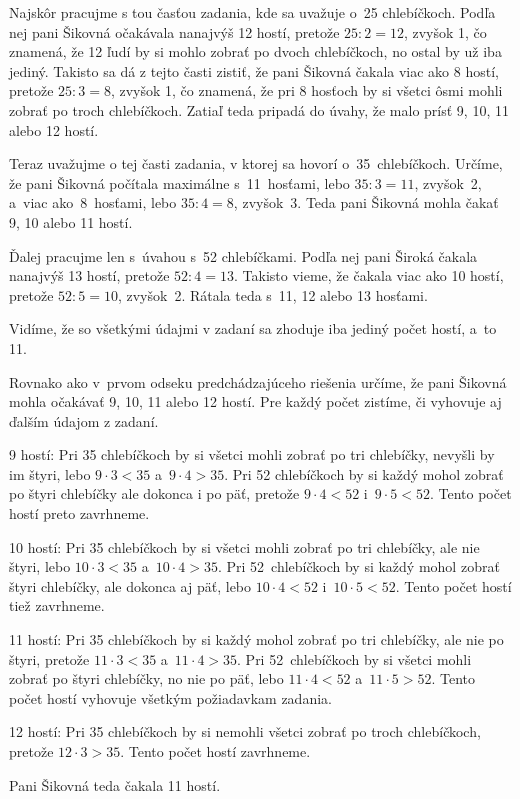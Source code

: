 {%
Najskôr pracujme s tou časťou zadania, kde sa uvažuje o~25 chlebíčkoch. Podľa nej
pani Šikovná očakávala nanajvýš 12 hostí, pretože $25 : 2 = 12$, zvyšok 1, čo
znamená, že 12 ľudí by si mohlo zobrať po dvoch chlebíčkoch, no ostal by už iba jediný.
Takisto sa dá z tejto časti zistiť, že pani Šikovná čakala viac ako 8 hostí, pretože
$25 : 3 = 8$, zvyšok 1, čo znamená, že pri 8 hosťoch by si všetci ôsmi mohli zobrať po
troch chlebíčkoch. Zatiaľ teda pripadá do úvahy, že malo prísť 9, 10, 11 alebo 12 hostí.

Teraz uvažujme o tej časti zadania, v ktorej sa hovorí o~35~chlebíčkoch. Určíme,
že pani Šikovná počítala maximálne s~11~hosťami, lebo $35 : 3 = 11$, zvyšok~2,
a~viac ako~8~hosťami, lebo $35 : 4 = 8$, zvyšok~3. Teda pani Šikovná mohla
čakať 9, 10 alebo 11 hostí.

Ďalej pracujme len s~úvahou s~52 chlebíčkami.  Podľa nej pani Široká čakala
nanajvýš 13 hostí, pretože $52 : 4 = 13$. Takisto vieme, že čakala viac ako 10 hostí, pretože
$52 : 5 = 10$, zvyšok~2. Rátala teda s~11, 12 alebo 13 hosťami.

Vidíme, že so všetkými údajmi v zadaní sa zhoduje iba jediný počet hostí, a~to 11.

\ineriesenie
Rovnako ako v~prvom odseku predchádzajúceho riešenia určíme, že pani Šikovná
mohla očakávať 9, 10, 11 alebo 12 hostí. Pre každý počet zistíme, či vyhovuje aj ďalším
údajom z zadaní.

9 hostí:
Pri 35 chlebíčkoch by si všetci mohli zobrať po tri chlebíčky, nevyšli by im štyri, lebo $9\cdot3 < 35$ a~$9\cdot4 > 35$. Pri 52 chlebíčkoch by si
každý mohol zobrať po štyri chlebíčky ale dokonca i po päť, pretože $9\cdot4 < 52$ i~$9\cdot5 < 52$. Tento počet hostí preto zavrhneme.

10 hostí:
Pri 35 chlebíčkoch by si všetci mohli zobrať po tri chlebíčky, ale nie štyri, lebo $10\cdot3 < 35$ a~$10\cdot4 > 35$. Pri 52~chlebíčkoch by
si každý mohol zobrať štyri chlebíčky, ale dokonca aj päť, lebo $10\cdot4 < 52$ i~$10\cdot5 < 52$. Tento počet hostí tiež zavrhneme.

11 hostí:
Pri 35 chlebíčkoch by si každý mohol zobrať po tri chlebíčky, ale nie po štyri, pretože $11\cdot3 < 35$ a~$11\cdot4 > 35$. Pri 52~chlebíčkoch by
si všetci mohli zobrať po štyri chlebíčky, no nie po päť, lebo $11\cdot4 < 52$ a~$11\cdot5 > 52$. Tento počet hostí vyhovuje všetkým požiadavkam zadania.

12 hostí:
Pri 35 chlebíčkoch by si nemohli všetci zobrať po troch chlebíčkoch, pretože $12\cdot3 > 35$. Tento počet hostí zavrhneme.

Pani Šikovná teda čakala 11 hostí.
}

